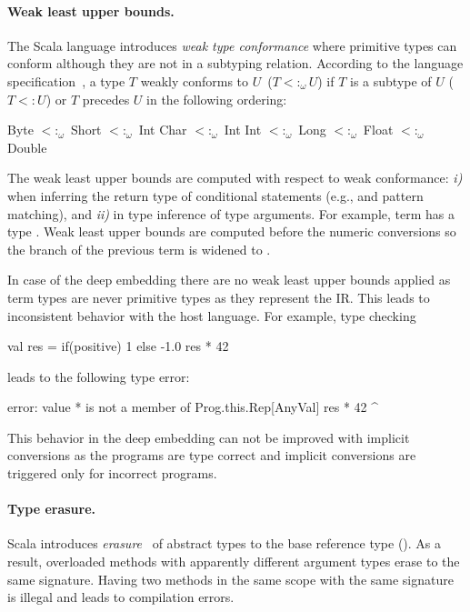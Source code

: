 \paragraph{Weak least upper bounds.} The Scala language introduces \emph{weak type conformance} where
  primitive types can conform although they are not in a subtyping relation. According to the
  language specification~\cite{odersky_scala_2004}, a type $T$ weakly conforms to $U$~($T <:_\omega U$)
  if $T$ is a subtype of $U$ ($T <: U$) or $T$ precedes $U$ in the following ordering:\begin{lstparagraph}
 Byte $<:_\omega$ Short $<:_\omega$ Int
 Char $<:_\omega$ Int
 Int $<:_\omega$ Long $<:_\omega$ Float $<:_\omega$ Double
 \end{lstparagraph}

The weak least upper bounds are computed with respect to weak conformance:
 \emph{i)} when inferring the return type of conditional statements (e.g., 
  and pattern matching), and \emph{ii)} in type inference of type arguments. For example,
  term  has a type . Weak least upper bounds
  are computed before the numeric conversions so the  branch of the
  previous term is widened to .

In case of the deep embedding there are no weak least upper bounds applied
 as term types are never primitive types as they represent the IR. This leads to
 inconsistent behavior with the host language. For example, type checking\begin{lstparagraph}
val res = if(positive) 1 else -1.0
res * 42
\end{lstparagraph}leads to the following type error:\begin{lstparagraph}
error: value * is not a member of Prog.this.Rep[AnyVal]
res * 42
    ^
\end{lstparagraph} This behavior in the deep embedding can not be improved with
 implicit conversions as the programs are type correct and implicit conversions
 are triggered only for incorrect programs.

\paragraph{Type erasure.} Scala introduces \emph{erasure}~\cite{odersky_scala_2004} of abstract types to
 the base reference type (). As a result, overloaded methods with apparently different
 argument types erase to the same signature. Having two methods in the same scope
  with the same signature is illegal and leads to compilation errors.

